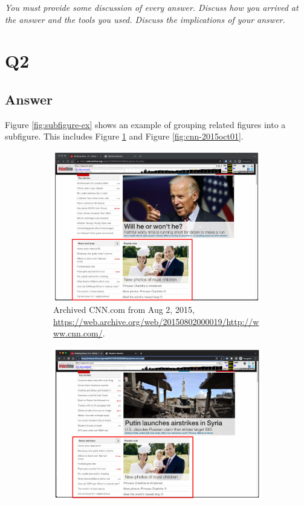 \documentclass[12pt]{article}
\begin{document}
\emph{You must provide some discussion of every answer. Discuss how you arrived at the answer and the tools you used. Discuss the implications of your answer.}

\section*{Q2}

\subsection*{Answer}

Figure \ref{fig:subfigure-ex} shows an example of grouping related figures into a subfigure.  This includes Figure \ref{fig:cnn-2015aug02} and Figure \ref{fig:cnn-2015oct01}.
\begin{figure}[ht]
\centering
\begin{subfigure}{0.45\textwidth}
  \centering
  \includegraphics[width=0.9\linewidth]{cnn-20150802-IA.png}
  \caption{Archived CNN.com from Aug 2, 2015, \url{https://web.archive.org/web/20150802000019/http://www.cnn.com/}.}
\label{fig:cnn-2015aug02}
\end{subfigure}
\hspace{20pt}
\begin{subfigure}{0.45\textwidth}
  \centering
  \includegraphics[width=0.9\linewidth]{cnn-20151001-IA.png}

\end{subfigure}
\end{figure}
\end{document}
